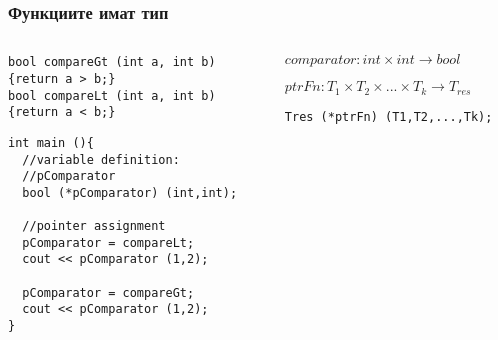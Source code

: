 \documentclass{beamer}
\begin{document}
\begin{frame}[fragile]
\frametitle{Функциите имат тип}

\begin{columns}[t]
  \begin{column}{0.5\textwidth}

\begin{flushleft}
\begin{lstlisting}
bool compareGt (int a, int b)
{return a > b;}
bool compareLt (int a, int b)
{return a < b;}
\end{lstlisting}  
\end{flushleft}
\pause
\begin{flushleft}
\begin{lstlisting}
int main (){
  //variable definition: 
  //pComparator
  bool (*pComparator) (int,int); 

  //pointer assignment
  pComparator = compareLt; 
  cout << pComparator (1,2);

  pComparator = compareGt; 
  cout << pComparator (1,2);
}
\end{lstlisting}  
\end{flushleft}

  \end{column}
  \begin{column}{0.5\textwidth}

$comparator: int \times int \rightarrow bool$

\pause
\vspace{50px}
$ptrFn: T_1 \times T_2 \times ... \times T_k \rightarrow T_{res}$
\pause
\begin{flushleft}
\begin{lstlisting}
Tres (*ptrFn) (T1,T2,...,Tk);
\end{lstlisting}  
\end{flushleft}

  \end{column}
\end{columns}

\end{frame}
\end{document}
